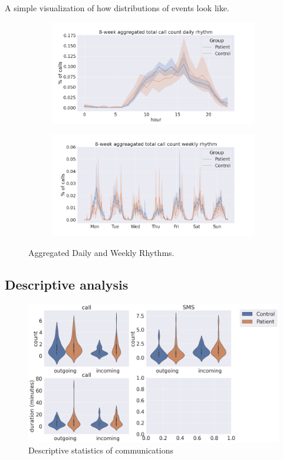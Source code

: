 \documentclass[journal, onecolumn, 11pt]{IEEEtran}
\begin{document}
A simple visualization of how distributions of events look like.

\begin{figure}[htbp]
    \centering
    \begin{subfigure}[b]{0.75\textwidth}
        \includegraphics[width=\textwidth]{figs/agg_total_call_rhythm.png}
    \end{subfigure}
    \vfill %
    \begin{subfigure}[b]{0.75\textwidth}
        \includegraphics[width=\textwidth]{figs/agg_total_call_count_weekly.png}
    \end{subfigure}
    \caption{Aggregated Daily and Weekly Rhythms.}
\end{figure}

\pagebreak
\subsection{Descriptive analysis}

\begin{figure}[htbp]
    \centering
    \includegraphics[width=\textwidth]{figs/1_descriptive_comm.png}
    \caption{Descriptive statistics of communications}
\end{figure}
\end{document}
